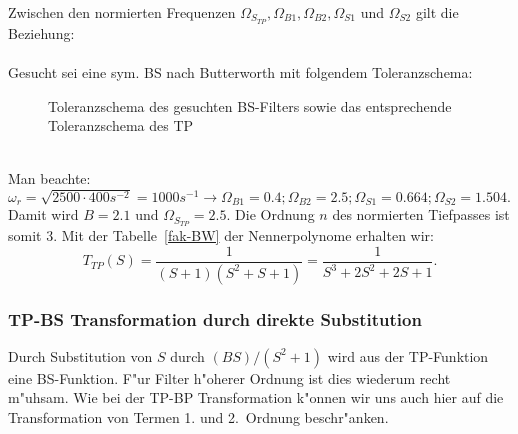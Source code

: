 \nit Zwischen den normierten Frequenzen
$\Omega_{S_{TP}},\Omega_{B1},\Omega_{B2},
\Omega_{S1}$ und $\Omega_{S2}$  gilt die Beziehung:\\~~\\
\bsp{}
Gesucht sei eine sym. BS nach Butterworth mit folgendem Toleranzschema:
\begin{figure}[!htb]
\vspace*{-3mm}
\begin{center}
  \caption{Toleranzschema des gesuchten BS-Filters sowie das entsprechende Toleranzschema des TP}
\end{center}
\vspace*{-6mm}
\end{figure}\\
\nit Man beachte: $\omega_{r}=\sqrt{2500\cdot 400 s^{-2}}=1000s^{-1}\longrightarrow\Omega_{B1}=0.4;\Omega_{B2}=2.5;\Omega_{S1}=0.664;\Omega_{S2}=1.504.$\\
\nit Damit wird $B=2.1$ und $\Omega_{S_{TP}}=2.5$. Die Ordnung $n$ des normierten Tiefpasses ist somit 3. Mit der Tabelle~\ref{fak-BW} der
Nennerpolynome erhalten wir:
\[
T_{TP}(S)=\frac{1}{(S+1)(S^{2}+S+1)}=\frac{1}{S^{3}+2S^{2}+2S+1}.
\]
\subsubsection{TP-BS Transformation durch direkte Substitution}
Durch Substitution von  $S$ durch $(BS)/(S^2+1)$ wird
aus der TP-Funktion eine BS-Funktion. F"ur Filter h"oherer Ordnung ist
dies wiederum recht m"uhsam. Wie bei der TP-BP Transformation k"onnen wir
uns auch hier auf die Transformation von Termen 1. und 2.~Ordnung beschr"anken.

